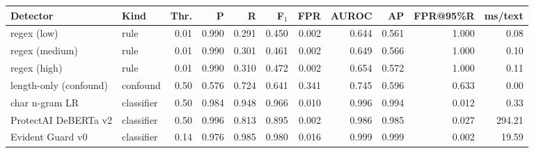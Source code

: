 \begin{tabular}{@{}llrrrrrrrrr@{}}
\toprule
Detector & Kind & Thr. & P & R & F$_1$ & FPR & AUROC & AP & FPR@95\%R & ms/text \\
\midrule
regex (low) & rule & 0.01 & 0.990 & 0.291 & 0.450 & 0.002 & 0.644 & 0.561 & 1.000 & 0.08 \\
regex (medium) & rule & 0.01 & 0.990 & 0.301 & 0.461 & 0.002 & 0.649 & 0.566 & 1.000 & 0.10 \\
regex (high) & rule & 0.01 & 0.990 & 0.310 & 0.472 & 0.002 & 0.654 & 0.572 & 1.000 & 0.11 \\
length-only (confound) & confound & 0.50 & 0.576 & 0.724 & 0.641 & 0.341 & 0.745 & 0.596 & 0.633 & 0.00 \\
char n-gram LR & classifier & 0.50 & 0.984 & 0.948 & 0.966 & 0.010 & 0.996 & 0.994 & 0.012 & 0.33 \\
ProtectAI DeBERTa v2 & classifier & 0.50 & 0.996 & 0.813 & 0.895 & 0.002 & 0.986 & 0.985 & 0.027 & 294.21 \\
Evident Guard v0 & classifier & 0.14 & 0.976 & 0.985 & 0.980 & 0.016 & 0.999 & 0.999 & 0.002 & 19.59 \\
\bottomrule
\end{tabular}
